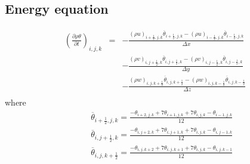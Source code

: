 \subsection{Energy equation}

\begin{eqnarray}
\left(\frac{\partial \rho \theta}{\partial t}\right)_{i,j,k}
&=& - \frac{(\rho u)_{i+\frac{1}{2},j,k} \overline{\theta}_{i+\frac{1}{2},j,k} 
           -(\rho u)_{i-\frac{1}{2},j,k} \overline{\theta}_{i-\frac{1}{2},j,k}}
     {\Delta x}\nonumber\\
& &  - \frac{(\rho v)_{i,j+\frac{1}{2},k} \overline{\theta}_{i,j+\frac{1}{2},k} 
           -(\rho v)_{i,j-\frac{1}{2},k} \overline{\theta}_{i,j-\frac{1}{2},k}}
     {\Delta y}\nonumber\\
& &  - \frac{(\rho w)_{i,j,k+\frac{1}{2}} \overline{\theta}_{i,j,k+\frac{1}{2}} 
           -(\rho w)_{i,j,k-\frac{1}{2}} \overline{\theta}_{i,j,k-\frac{1}{2}}}
     {\Delta z}\nonumber\\
\end{eqnarray}
where
\begin{eqnarray}
&& \overline{\theta}_{i+\frac{1}{2},j,k} = 
\frac{-\theta_{i+2,j,k}+7\theta_{i+1,j,k}+7\theta_{i,j,k}-\theta_{i-1,j,k}}{12}\\
&& \overline{\theta}_{i,j+\frac{1}{2},k} = 
\frac{-\theta_{i,j+2,k}+7\theta_{i,j+1,k}+7\theta_{i,j,k}-\theta_{i,j-1,k}}{12}\\
&& \overline{\theta}_{i,j,k+\frac{1}{2}} = 
\frac{-\theta_{i,j,k+2}+7\theta_{i,j,k+1}+7\theta_{i,j,k}-\theta_{i,j,k-1}}{12}
\end{eqnarray}


